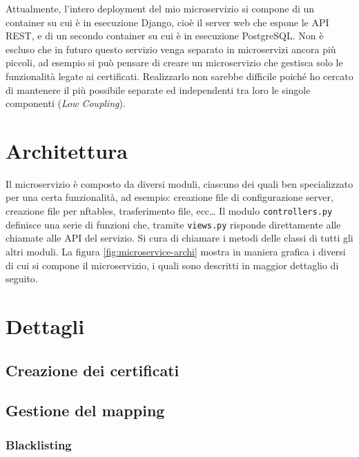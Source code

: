 Attualmente, l'intero deployment del mio microservizio si compone di un container
su cui è in esecuzione Django, cioè il server web che espone le API REST, e
di un secondo container su cui è in esecuzione PostgreSQL.
Non è escluso che in futuro questo servizio venga separato in microservizi
ancora più piccoli, ad esempio si può pensare di creare un microservizio
che gestisca solo le funzionalità legate ai certificati. Realizzarlo non sarebbe
difficile poiché ho cercato di mantenere il più possibile separate ed independenti
tra loro le singole componenti (\textit{Low Coupling}).

\section{Architettura}
Il microservizio è composto da diversi moduli, ciascuno dei quali ben
specializzato per una certa funzionalità, ad esempio: creazione file di configurazione
server, creazione file per nftables, trasferimento file, ecc\ldots
Il modulo \texttt{controllers.py}  definisce
una serie di funzioni che, tramite \texttt{views.py} risponde direttamente alle
chiamate alle API del servizio. Si cura di chiamare i metodi delle classi di tutti
gli altri moduli.
La figura \ref{fig:microservice-archi} mostra in maniera grafica i diversi di cui
si compone il microservizio, i quali sono descritti in maggior dettaglio di seguito.


\section{Dettagli}

\subsection{Creazione dei certificati}

\subsection{Gestione del mapping}

\subsubsection{Blacklisting}

